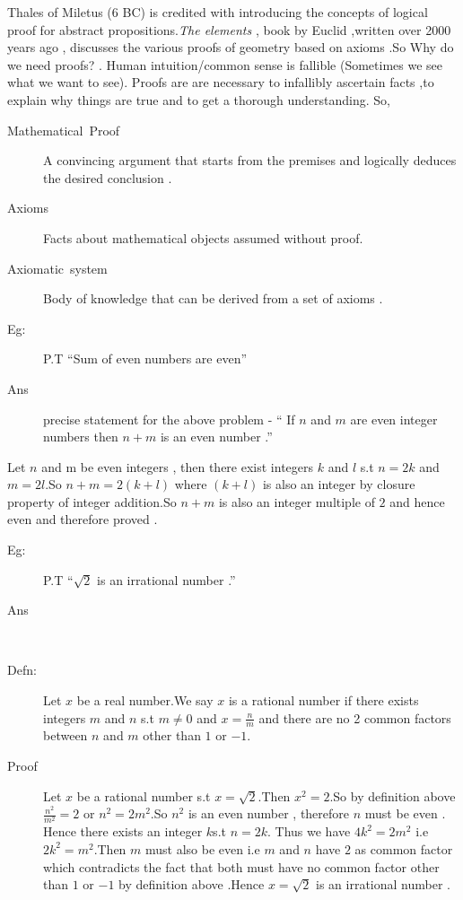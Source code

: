 \documentclass[a4paper,english]{article}
\begin{document}
Thales of Miletus (6 BC) is credited with introducing the concepts
of logical proof for abstract propositions.\emph{The elements} , book
by Euclid ,written over 2000 years ago , discusses the various proofs
of geometry based on axioms .So Why do we need proofs? . Human intuition/common
sense is fallible (Sometimes we see what we want to see). Proofs are
are necessary to infallibly ascertain facts ,to explain why things
are true and to get a thorough understanding. So,
\begin{description}
\item [{Mathematical~Proof}] A convincing argument that starts from the
premises and logically deduces the desired conclusion .
\item [{Axioms}] Facts about mathematical objects assumed without proof.
\item [{Axiomatic~system}] Body of knowledge that can be derived from
a set of axioms .
\item [{Eg:}] P.T ``Sum of even numbers are even''
\item [{Ans}] precise statement for the above problem - `` If $n$ and
$m$ are even integer numbers then $n+m$ is an even number .''
\end{description}
Let $n$ and m be even integers , then there exist integers $k$ and
$l$ s.t $n=2k$ and $m=2l$.So $n+m=2(k+l)$ where $(k+l)$ is also
an integer by closure property of integer addition.So $n+m$ is also
an integer multiple of $2$ and hence even and therefore proved .
\begin{description}
\item [{Eg:}] P.T ``$\sqrt{2}$ is an irrational number .''
\item [{Ans}]~
\item [{Defn:}] Let $x$ be a real number.We say $x$ is a rational number
if there exists integers $m$ and $n$ s.t $m\ne0$ and $x=\frac{n}{m}$
and there are no 2 common factors between $n$ and $m$ other than
$1$ or $-1$. 
\item [{Proof}] Let $x$ be a rational number s.t $x=\sqrt{2}$.Then $x^{2}=2$.So
by definition above $\frac{n^{2}}{m^{2}}=2$ or $n^{2}=2m^{2}$.So
$n^{2}$ is an even number , therefore $n$ must be even . Hence there
exists an integer $k$s.t $n=2k$. Thus we have $4k^{2}=2m^{2}$ i.e
$2k^{2}=m^{2}$.Then $m$ must also be even i.e $m$ and $n$ have
$2$ as common factor which contradicts the fact that both must have
no common factor other than $1$ or $-1$ by definition above .Hence
$x=\sqrt{2}$ is an irrational number .
\end{description}
\end{document}
